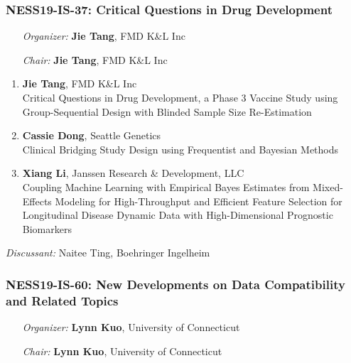 \subsubsection*{NESS19-IS-37: Critical Questions in Drug Development}

\begin{enumerate}[align=left]
\item [\emph{Organizer:}] \textbf{Jie Tang}, FMD K\&L Inc
\item [\emph{Chair:}] \textbf{Jie Tang}, FMD K\&L Inc
\end{enumerate}

\begin{enumerate}
\item \textbf{Jie Tang}, FMD K\&L Inc \\
Critical Questions in Drug Development, a Phase 3 Vaccine Study using Group-Sequential Design with Blinded Sample Size Re-Estimation
\item \textbf{Cassie Dong}, Seattle Genetics \\
Clinical Bridging Study Design using Frequentist and Bayesian Methods
\item \textbf{Xiang Li}, Janssen Research \& Development, LLC \\
Coupling Machine Learning with Empirical Bayes Estimates from Mixed-Effects Modeling for High-Throughput and Efficient Feature Selection for Longitudinal Disease Dynamic Data with High-Dimensional Prognostic Biomarkers
\end{enumerate}

\emph{Discussant:} Naitee Ting, Boehringer Ingelheim

\subsubsection*{NESS19-IS-60: New Developments on Data Compatibility and Related  Topics}

\begin{enumerate}[align=left]
\item [\emph{Organizer:}] \textbf{Lynn Kuo}, University of Connecticut
\item [\emph{Chair:}] \textbf{Lynn Kuo}, University of Connecticut
\end{enumerate}

